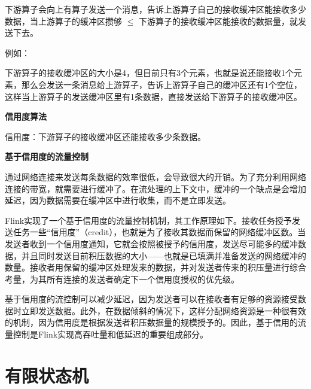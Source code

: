 \documentclass[cn,11pt,chinese]{elegantbook}
\begin{document}
下游算子会向上有算子发送一个消息，告诉上游算子自己的接收缓冲区能接收多少数据，当上游算子的缓冲区攒够 $\le$ 下游算子的接收缓冲区能接收的数据量，就发送下去。

例如：

下游算子的接收缓冲区的大小是4，但目前只有3个元素，也就是说还能接收1个元素，那么会发送一条消息给上游算子，告诉上游算子自己的缓冲区还有1个空位，这样当上游算子的发送缓冲区里有1条数据，直接发送给下游算子的接收缓冲区。

\textbf{信用度算法}

信用度：下游算子的接收缓冲区还能接收多少条数据。

\textbf{基于信用度的流量控制}

通过网络连接来发送每条数据的效率很低，会导致很大的开销。为了充分利用网络连接的带宽，就需要进行缓冲了。在流处理的上下文中，缓冲的一个缺点是会增加延迟，因为数据需要在缓冲区中进行收集，而不是立即发送。

Flink实现了一个基于信用度的流量控制机制，其工作原理如下。接收任务授予发送任务一些“信用度”（credit），也就是为了接收其数据而保留的网络缓冲区数。当发送者收到一个信用度通知，它就会按照被授予的信用度，发送尽可能多的缓冲数据，并且同时发送目前积压数据的大小——也就是已填满并准备发送的网络缓冲的数量。接收者用保留的缓冲区处理发来的数据，并对发送者传来的积压量进行综合考量，为其所有连接的发送者确定下一个信用度授权的优先级。

基于信用度的流控制可以减少延迟，因为发送者可以在接收者有足够的资源接受数据时立即发送数据。此外，在数据倾斜的情况下，这样分配网络资源是一种很有效的机制，因为信用度是根据发送者积压数据量的规模授予的。因此，基于信用的流量控制是Flink实现高吞吐量和低延迟的重要组成部分。

\chapter{有限状态机}
\end{document}
